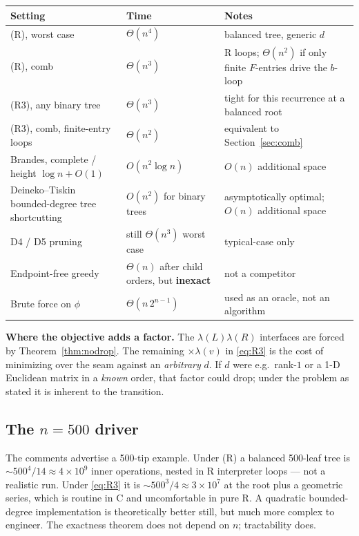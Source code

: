 \documentclass[11pt]{article}
\theoremstyle{plain}
\begin{document}
\begin{center}
\renewcommand{\arraystretch}{1.4}
\begin{tabular}{@{}l l l@{}}
\toprule
Setting & Time & Notes \\
\midrule
(R), worst case & \(\Theta(n^4)\) & balanced tree, generic \(d\) \\
(R), comb & \(\Theta(n^3)\) & R loops; \(\Theta(n^2)\) if only finite
\(F\)-entries drive the \(b\)-loop \\
(R3), any binary tree & \(\Theta(n^3)\) & tight for this recurrence at a
balanced root \\
(R3), comb, finite-entry loops & \(\Theta(n^2)\) & equivalent to
Section~\ref{sec:comb} \\
Brandes, complete / height \(\log n+O(1)\) & \(O(n^2 \log n)\) & \(O(n)\)
additional space \\
Deineko--Tiskin bounded-degree tree shortcutting & \(O(n^2)\) for binary trees
& asymptotically optimal; \(O(n)\) additional space \\
D4 / D5 pruning & still \(\Theta(n^3)\) worst case & typical-case only \\
Endpoint-free greedy & \(\Theta(n)\) after child orders, but \textbf{inexact}
& not a competitor \\
Brute force on \(\phi\) & \(\Theta(n\,2^{n-1})\) & used as an oracle, not an
algorithm \\
\bottomrule
\end{tabular}
\end{center}

\textbf{Where the objective adds a factor.} The
\(\lambda(L)\lambda(R)\) interfaces are forced by Theorem~\ref{thm:nodrop}. The
remaining \(\times \lambda(v)\) in \eqref{eq:R3} is the cost of minimizing over
the seam against an \emph{arbitrary} \(d\). If \(d\) were e.g.\ rank-\(1\) or a
1-D Euclidean matrix in a \emph{known} order, that factor could drop; under the
problem as stated it is inherent to the transition.

\subsection{The \(n = 500\) driver}

The comments advertise a 500-tip example. Under (R) a balanced 500-leaf tree is
\(\sim 500^4 / 14 \approx 4 \times 10^9\) inner operations, nested in R
interpreter loops --- not a realistic run. Under \eqref{eq:R3} it is
\(\sim 500^3 / 4 \approx 3 \times 10^7\) at the root plus a geometric series,
which is routine in C and uncomfortable in pure R. A quadratic bounded-degree
implementation is theoretically better still, but much more complex to
engineer. The exactness theorem does not depend on \(n\); tractability does.
\end{document}
